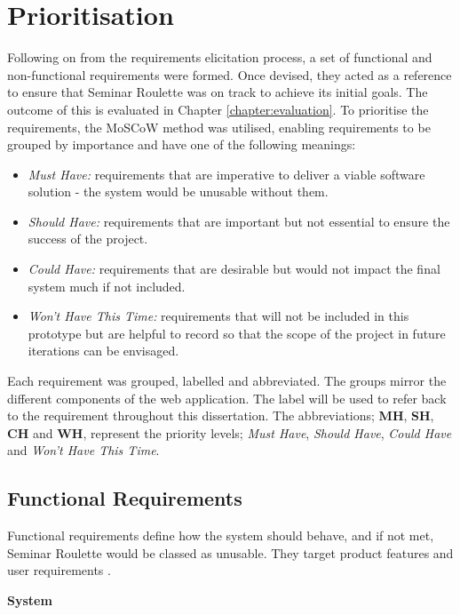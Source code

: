 \documentclass{l4proj}
\begin{document}
\section{Prioritisation}

Following on from the requirements elicitation process, a set of functional and non-functional requirements were formed. Once devised, they acted as a reference to ensure that Seminar Roulette was on track to achieve its initial goals. The outcome of this is evaluated in Chapter \ref{chapter:evaluation}. To prioritise the requirements, the MoSCoW method was utilised, enabling requirements to be grouped by importance \citep{MoSCoW} and have one of the following meanings:

\begin{itemize}
    \item \emph{Must Have:} requirements that are imperative to deliver a viable software solution - the system would be unusable without them.
    \item \emph{Should Have:} requirements that are important but not essential to ensure the success of the project.
    \item \emph{Could Have:} requirements that are desirable but would not impact the final system much if not included.
    \item \emph{Won't Have This Time:} requirements that will not be included in this prototype but are helpful to record so that the scope of the project in future iterations can be envisaged.
\end{itemize}

Each requirement was grouped, labelled and abbreviated. The groups mirror the different components of the web application. The label will be used to refer back to the requirement throughout this dissertation. The abbreviations; \textbf{MH}, \textbf{SH}, \textbf{CH} and \textbf{WH}, represent the priority levels; \emph{Must Have}, \emph{Should Have}, \emph{Could Have} and \emph{Won't Have This Time}.

\subsection{Functional Requirements}
\label{section:functional_requirements}

Functional requirements define how the system should behave, and if not met, Seminar Roulette would be classed as unusable. They target product features and user requirements \citep{requirements}.

\textbf{System}
\end{document}
